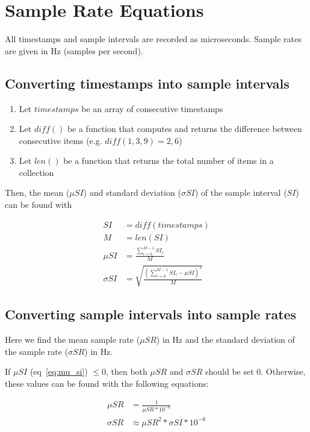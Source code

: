 \documentclass[11pt]{article}
\begin{document}
    \section{Sample Rate Equations}\label{sec:sample-rate-equations}
    All timestamps and sample intervals are recorded as microseconds.
    Sample rates are given in Hz (samples per second).

    \subsection{Converting timestamps into sample intervals}\label{subsec:converting-timestamps-into-sample-intervals}

    \begin{enumerate}
        \item Let $timestamps$ be an array of consecutive timestamps
        \item Let $diff()$ be a function that computes and returns the difference between consecutive items (e.g. $diff(1,3,9)=2,6$)
        \item Let $len()$ be a function that returns the total number of items in a collection
    \end{enumerate}

    Then, the mean ($\mu SI$) and standard deviation ($\sigma SI$) of the sample interval ($SI$) can be found with

    \begin{align}
        SI &= diff(timestamps) \\
        M &= len(SI) \\
        \mu SI &= \frac{\sum_{i=0}^{M-1} SI_i}{M} \\ \label{eq:mu_si}
        \sigma SI &= \sqrt{\frac{(\sum_{i=0}^{M-1} SI_i - \mu SI)^2}{M}}
    \end{align}

    \subsection{Converting sample intervals into sample rates}\label{subsec:converting-sample-intervals-into-sample-rates}

    Here we find the mean sample rate ($\mu SR$) in Hz and the standard deviation of the sample rate ($\sigma SR$) in Hz.

    If $\mu SI$ (eq~\ref{eq:mu_si}) $\leq 0$, then both $\mu SR$ and $\sigma SR$ should be set 0. Otherwise, these values can be found with the following equations:

    \begin{align}
        \mu SR &= \frac{1}{\mu SR * 10^{-6}} \\
        \sigma SR &\approx \mu SR^2 * \sigma SI * 10^{-6}
    \end{align}
\end{document}
